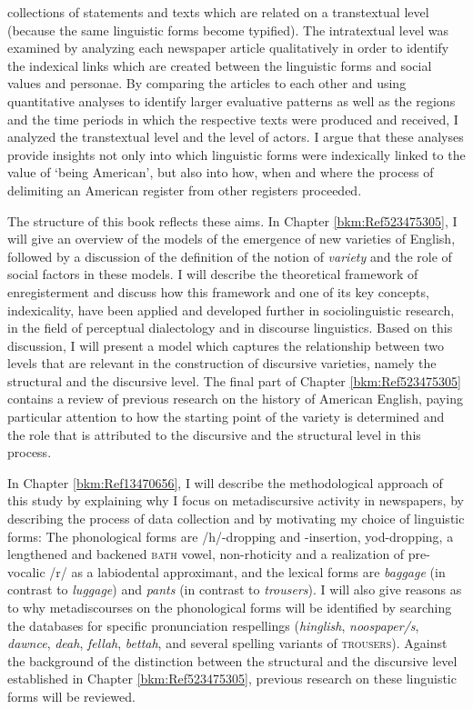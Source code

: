collections of statements and texts which are related on a transtextual level (because the same linguistic forms become typified). The intratextual level was examined by analyzing each newspaper article qualitatively in order to identify the indexical links which are created between the linguistic forms and social values and personae. By comparing the articles to each other and using quantitative analyses to identify larger evaluative patterns as well as the regions and the time periods in which the respective texts were produced and received, I analyzed the transtextual level and the level of actors. I argue that these analyses provide insights not only into which linguistic forms were indexically linked to the value of ‘being American’, but also into how, when and where the process of delimiting an American register from other registers proceeded.

The structure of this book reflects these aims. In Chapter \ref{bkm:Ref523475305}, I will give an overview of the models of the emergence of new varieties of English, followed by a discussion of the definition of the notion of \textit{variety} and the role of social factors in these models. I will describe the theoretical framework of enregisterment and discuss how this framework and one of its key concepts, indexicality, have been applied and developed further in sociolinguistic research, in the field of perceptual dialectology and in discourse linguistics. Based on this discussion, I will present a model which captures the relationship between two levels that are relevant in the construction of discursive varieties, namely the structural and the discursive level. The final part of Chapter \ref{bkm:Ref523475305} contains a review of previous research on the history of American English, paying particular attention to how the starting point of the variety is determined and the role that is attributed to the discursive and the structural level in this process.

In Chapter \ref{bkm:Ref13470656}, I will describe the methodological approach of this study by explaining why I focus on metadiscursive activity in newspapers, by describing the process of data collection and by motivating my choice of linguistic forms: The phonological forms are /h/-dropping and -insertion, yod-dropping, a lengthened and backened \textsc{bath} vowel, non-rhoticity and a realization of pre-vocalic /r/ as a labiodental approximant, and the lexical forms are \emph{baggage} (in contrast to \emph{luggage}) and \emph{pants} (in contrast to \emph{trousers}). I will also give reasons as to why metadiscourses on the phonological forms will be identified by searching the databases for specific pronunciation respellings (\emph{hinglish}, \emph{noospaper/s}, \emph{dawnce}, \emph{deah}, \emph{fellah}, \emph{bettah}, and several spelling variants of \textsc{trousers}). Against the background of the distinction between the structural and the discursive level established in Chapter \ref{bkm:Ref523475305}, previous research on these linguistic forms will be reviewed.


